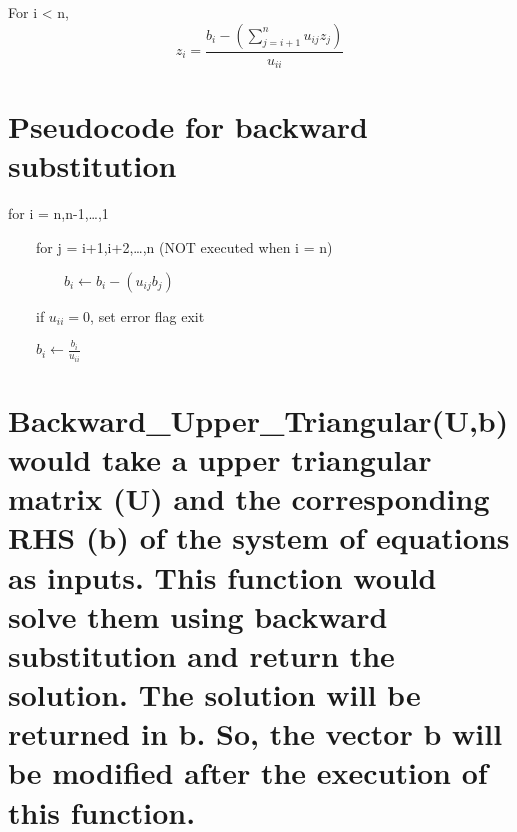 \documentclass[11pt]{article}
\begin{document}
    For i \textless{} n,
\[z_i = \frac{b_i - \left(\sum_{j = i+1}^{n}u_{ij}z_{j}\right)}{u_{ii}}\]

    \hypertarget{pseudocode-for-backward-substitution}{%
\section{Pseudocode for backward
substitution}\label{pseudocode-for-backward-substitution}}

    for i = n,n-1,\ldots{},1

    \(\qquad\)for j = i+1,i+2,\ldots{},n (NOT executed when i = n)

    \(\qquad\)\(\qquad\)\(b_i\leftarrow b_i - (u_{ij}b_j)\)

    \(\qquad\)if \(u_{ii} = 0\), set error flag exit

    \(\qquad\)\(b_i\leftarrow \frac{b_i}{u_{ii}}\)

    \hypertarget{backward_upper_triangularub-would-take-a-upper-triangular-matrix-u-and-the-corresponding-rhs-b-of-the-system-of-equations-as-inputs.-this-function-would-solve-them-using-backward-substitution-and-return-the-solution.-the-solution-will-be-returned-in-b.-so-the-vector-b-will-be-modified-after-the-execution-of-this-function.}{%
\section{Backward\_Upper\_Triangular(U,b) would take a upper triangular
matrix (U) and the corresponding RHS (b) of the system of equations as
inputs. This function would solve them using backward substitution and
return the solution. The solution will be returned in b. So, the vector
b will be modified after the execution of this
function.}\label{backward_upper_triangularub-would-take-a-upper-triangular-matrix-u-and-the-corresponding-rhs-b-of-the-system-of-equations-as-inputs.-this-function-would-solve-them-using-backward-substitution-and-return-the-solution.-the-solution-will-be-returned-in-b.-so-the-vector-b-will-be-modified-after-the-execution-of-this-function.}}
\end{document}
